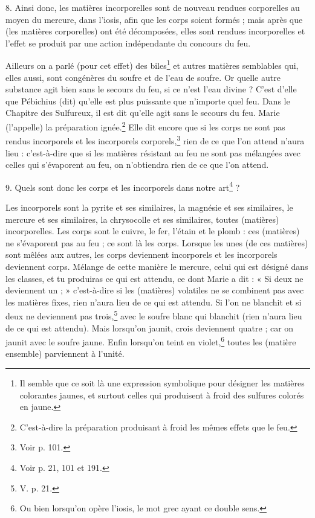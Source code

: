 \documentclass[landscape, a4paper, 11pt, oneside, polutonikogreek, french]{article}
\begin{document}
8. Ainsi donc, les matières incorporelles sont de nouveau rendues corporelles au moyen du mercure, dans l'iosis, afin que les corps soient formés ; mais après que (les matières corporelles) ont été décomposées, elles sont rendues incorporelles et l'effet se produit par une action indépendante du concours du feu.

Ailleurs on a parlé (pour cet effet) des biles\footnote{Il semble que ce soit là une expression symbolique pour désigner les matières colorantes jaunes, et surtout celles qui produisent à froid des sulfures colorés en jaune.} et autres matières semblables qui, elles aussi, sont congénères du soufre et de l'eau de soufre. Or quelle autre substance agit bien sans le secours du feu, si ce n'est l'eau divine ? C'est d'elle que Pébichius (dit) qu'elle est plus puissante que n'importe quel feu. Dans le Chapitre des Sulfureux, il est dit qu'elle agit sans le secours du feu. Marie (l'appelle) la préparation ignée.\footnote{C'est-à-dire la préparation produisant à froid les mêmes effets que le feu.} Elle dit encore que si les corps ne sont pas rendus incorporels et les incorporels corporels,\footnote{Voir p. 101.} rien de ce que l'on attend n'aura lieu : c'est-à-dire que si les matières résistant au feu ne sont pas mélangées avec celles qui s'évaporent au feu, on n'obtiendra rien de ce que l'on attend.

9. Quels sont donc les corps et les incorporels dans notre art\footnote{Voir p. 21, 101 et 191.} ?

Les incorporels sont la pyrite et ses similaires, la magnésie et ses similaires, le mercure et ses similaires, la chrysocolle et ses similaires, toutes (matières) incorporelles. Les corps sont le cuivre, le fer, l'étain et le plomb : ces (matières) ne s'évaporent pas au feu ; ce sont là les corps. Lorsque les unes (de ces matières) sont mêlées aux autres, les corps deviennent incorporels et les incorporels deviennent corps. Mélange de cette manière le mercure, celui qui est désigné dans les classes, et tu produiras ce qui est attendu, ce dont Marie a dit : « Si deux ne deviennent un ; » c'est-à-dire si les (matières) volatiles ne se combinent pas avec les matières fixes, rien n'aura lieu de ce qui est attendu. Si l'on ne blanchit et si deux ne deviennent pas trois,\footnote{V. p. 21.} avec le soufre blanc qui blanchit (rien n'aura lieu de ce qui est attendu). Mais lorsqu'on jaunit, crois deviennent quatre ; car on jaunit avec le soufre jaune. Enfin lorsqu'on teint en violet,\footnote{Ou bien lorsqu'on opère l'iosis, le mot grec ayant ce double sens.} toutes les (matière ensemble) parviennent à l'unité.
\end{document}

